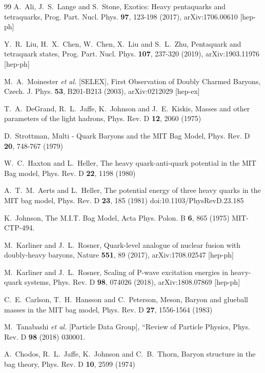 \documentclass[12pt,prd,onecolumn,floatfix,nofootinbib]{revtex4}
\begin{document}
\begin{thebibliography}{99}
 A.~Ali, J.~S.~Lange and S.~Stone, Exotics: Heavy
pentaquarks and tetraquarks, Prog. Part. Nucl. Phys. \textbf{97}, 123-198
(2017), arXiv:1706.00610 [hep-ph]

 Y.~R.~Liu, H.~X.~Chen, W.~Chen, X.~Liu and S.~L.~Zhu,
Pentaquark and tetraquark states, Prog. Part. Nucl. Phys. \textbf{107},
237-320 (2019), arXiv:1903.11976 [hep-ph]

 M.~A.~Moinester \textit{et al.} [SELEX], First
Observation of Doubly Charmed Baryons, Czech. J. Phys. \textbf{53},
B201-B213 (2003), arXiv:0212029 [hep-ex]

 T.~A.~DeGrand, R.~L.~Jaffe, K.~Johnson and
J.~E.~Kiskis, Masses and other parameters of the light hadrons, Phys. Rev. D
\textbf{12}, 2060 (1975)

 D.~Strottman, Multi - Quark Baryons and the MIT
Bag Model, Phys. Rev. D \textbf{20}, 748-767 (1979)

 W.~C.~Haxton and L.~Heller, The heavy
quark-anti-quark potential in the {MIT} Bag model, Phys. Rev. D \textbf{22},
1198 (1980)

 A.~T.~M.~Aerts and L.~Heller, The potential energy of
three heavy quarks in the {MIT} bag model, Phys. Rev. D \textbf{23}, 185
(1981) doi:10.1103/PhysRevD.23.185

 K.~Johnson, The M.I.T. Bag Model, Acta Phys. Polon.
B \textbf{6}, 865 (1975) MIT-CTP-494.

 M.~Karliner and J.~L.~Rosner, Quark-level
analogue of nuclear fusion with doubly-heavy baryons, Nature \textbf{551},
89 (2017), arXiv:1708.02547 [hep-ph]

 M.~Karliner and J.~L.~Rosner, Scaling of P-wave
excitation energies in heavy-quark systems, Phys. Rev. D \textbf{98}, 074026
(2018), arXiv:1808.07869 [hep-ph]

 C.~E.~Carlson, T.~H.~Hansson and C.~Peterson,
Meson, Baryon and glueball masses in the MIT bag model, Phys. Rev. D \textbf{%
27}, 1556-1564 (1983)

 M.~Tanabashi \textit{et al.} [Particle Data Group],
\textquotedblleft Review of Particle Physics, Phys. Rev. D \textbf{98}
(2018) 030001. %

 A.~Chodos, R.~L.~Jaffe, K.~Johnson and C.~B.~Thorn,
Baryon structure in the bag theory, Phys. Rev. D \textbf{10}, 2599 (1974)


\end{thebibliography}
\end{document}
